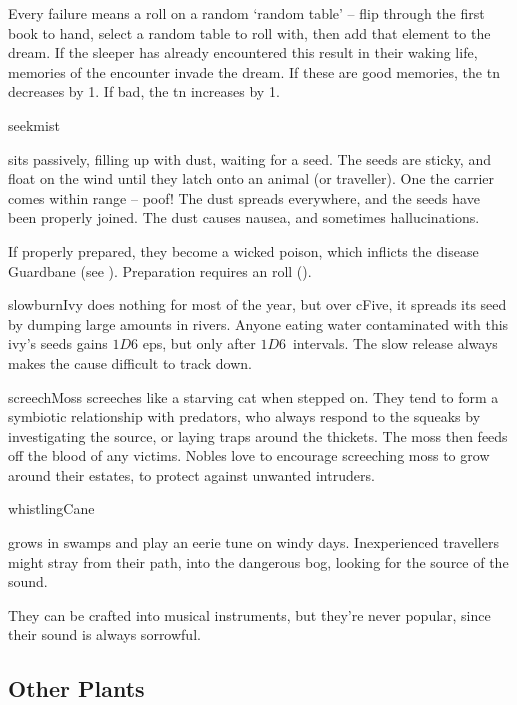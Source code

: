 \begin{multicols}{2}
{    Every failure means a roll on a random `random table' -- flip through the first book to hand, select a random table to roll with, then add that element to the dream.
    If the sleeper has already encountered this result in their waking life, memories of the encounter invade the dream.
    If these are good memories, the \gls{tn} decreases by 1.
    If bad, the \gls{tn} increases by 1.
  }

%
  {seekmist}%
  {sits passively, filling up with dust, waiting for a seed.
  The seeds are sticky, and float on the wind until they latch onto an animal (or traveller).
  One the carrier comes within range -- poof!
  The dust spreads everywhere, and the seeds have been properly joined.
  The dust causes nausea, and sometimes hallucinations.

  If properly prepared, they become a wicked poison, which inflicts the disease Guardbane (see ).
  Preparation requires an  roll (\tn[12]).
    }

%
  {slowburnIvy}%
  {does nothing for most of the year, but over \gls{cFive}, it spreads its seed by dumping large amounts in rivers.
  Anyone eating water contaminated with this ivy's seeds gains $1D6$ \glspl{ep}, but only after $1D6$~\glspl{interval}.
  The slow release always makes the cause difficult to track down.}

%
  {screechMoss}%
  {screeches like a starving cat when stepped on.
  They tend to form a symbiotic relationship with predators, who always respond to the squeaks by investigating the source, or laying traps around the thickets.
  The moss then feeds off the blood of any victims.
  Nobles love to encourage screeching moss to grow around their estates, to protect against unwanted intruders.
  }

%
  {whistlingCane}%
  {grows in swamps and play an eerie tune on windy days.
  Inexperienced travellers might stray from their path, into the dangerous bog, looking for the source of the sound.

  They can be crafted into musical instruments, but they're never popular, since their sound is always sorrowful.}

\subsection{Other Plants}
\setcounter{encnum}{8}


\end{multicols}
